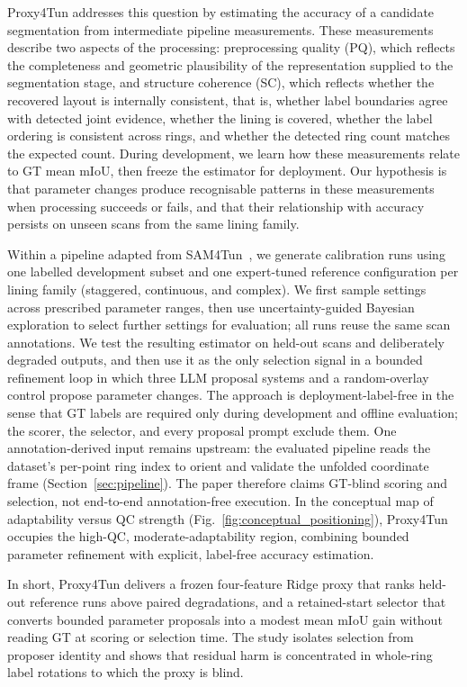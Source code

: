 \documentclass[a4paper,fleqn]{cas-dc}
\begin{document}
Proxy4Tun addresses this question by estimating the accuracy of a candidate segmentation from intermediate pipeline measurements. These measurements describe two aspects of the processing: preprocessing quality (PQ), which reflects the completeness and geometric plausibility of the representation supplied to the segmentation stage, and structure coherence (SC), which reflects whether the recovered layout is internally consistent, that is, whether label boundaries agree with detected joint evidence, whether the lining is covered, whether the label ordering is consistent across rings, and whether the detected ring count matches the expected count. During development, we learn how these measurements relate to GT mean mIoU, then freeze the estimator for deployment. Our hypothesis is that parameter changes produce recognisable patterns in these measurements when processing succeeds or fails, and that their relationship with accuracy persists on unseen scans from the same lining family.

Within a pipeline adapted from SAM4Tun~\cite{ye2025sam4tun}, we generate calibration runs using one labelled development subset and one expert-tuned reference configuration per lining family (staggered, continuous, and complex). We first sample settings across prescribed parameter ranges, then use uncertainty-guided Bayesian exploration to select further settings for evaluation; all runs reuse the same scan annotations. We test the resulting estimator on held-out scans and deliberately degraded outputs, and then use it as the only selection signal in a bounded refinement loop in which three LLM proposal systems and a random-overlay control propose parameter changes. The approach is deployment-label-free in the sense that GT labels are required only during development and offline evaluation; the scorer, the selector, and every proposal prompt exclude them. One annotation-derived input remains upstream: the evaluated pipeline reads the dataset's per-point ring index to orient and validate the unfolded coordinate frame (Section~\ref{sec:pipeline}). The paper therefore claims GT-blind scoring and selection, not end-to-end annotation-free execution. In the conceptual map of adaptability versus QC strength (Fig.~\ref{fig:conceptual_positioning}), Proxy4Tun occupies the high-QC, moderate-adaptability region, combining bounded parameter refinement with explicit, label-free accuracy estimation.

In short, Proxy4Tun delivers a frozen four-feature Ridge proxy that ranks held-out reference runs above paired degradations, and a retained-start selector that converts bounded parameter proposals into a modest mean mIoU gain without reading GT at scoring or selection time. The study isolates selection from proposer identity and shows that residual harm is concentrated in whole-ring label rotations to which the proxy is blind.
\end{document}
